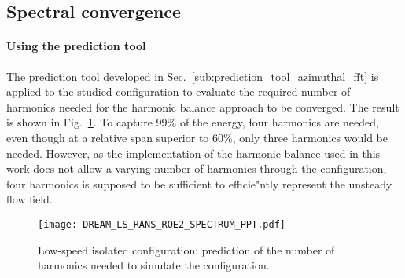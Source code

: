 
\subsection{Spectral convergence} 
\label{sub:dream_ls_hb_convergence_hb}

\paragraph{Using the prediction tool}
\label{par:dream_ls_conv_hb_prediction_tool}

The prediction tool developed in 
Sec.~\ref{sub:prediction_tool_azimuthal_fft} is applied
to the studied configuration to evaluate the
required number of harmonics needed for the
harmonic balance approach to be converged.
The result is shown in Fig.~\ref{fig:DREAM_LS_RANS_ROE2_SPECTRUM_PPT}.
To capture 99\% of the energy, four harmonics are needed, even though
at a relative span superior to 60\%, only three harmonics would be needed.
However, as the implementation of the harmonic balance used
in this work does not allow a varying number of harmonics through the
configuration, four harmonics is supposed to be sufficient to efficie"ntly 
represent the unsteady flow field.
\begin{figure}[htp]
  \centering
  \texttt{[image: DREAM\_LS\_RANS\_ROE2\_SPECTRUM\_PPT.pdf]}
  \caption{Low-speed isolated configuration: prediction of the number
  of harmonics needed to simulate the configuration.}
  \label{fig:DREAM_LS_RANS_ROE2_SPECTRUM_PPT}
\end{figure}

